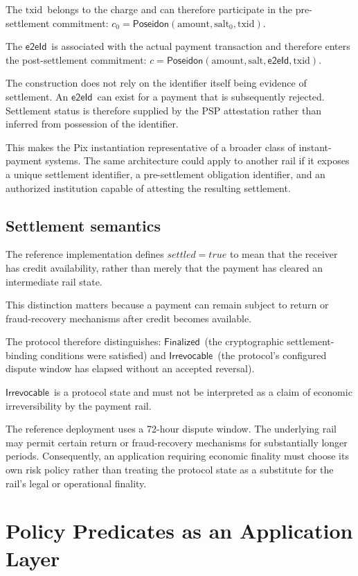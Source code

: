 \documentclass[10pt,twocolumn]{article}
\newcommand{\Poseidon}{\ensuremath{\mathsf{Poseidon}}}
\newcommand{\eeid}{\ensuremath{\mathsf{e2eId}}}
\newcommand{\amount}{\ensuremath{\text{amount}}}
\newcommand{\txid}{\ensuremath{\text{txid}}}
\newcommand{\salt}{\ensuremath{\text{salt}}}
\newcommand{\Finalized}{\ensuremath{\mathsf{Finalized}}}
\newcommand{\Irrevocable}{\ensuremath{\mathsf{Irrevocable}}}
\begin{document}
The \txid\ belongs to the charge and can therefore participate in the
pre-settlement commitment: $c_0=\Poseidon(\amount,\salt_0,\txid)$.

The \eeid\ is associated with the actual payment transaction and
therefore enters the post-settlement commitment:
$c=\Poseidon(\amount,\salt,\eeid,\txid)$.

The construction does not rely on the identifier itself being evidence
of settlement. An \eeid\ can exist for a payment that is subsequently
rejected. Settlement status is therefore supplied by the PSP attestation
rather than inferred from possession of the identifier.

This makes the Pix instantiation representative of a broader class of
instant-payment systems. The same architecture could apply to another
rail if it exposes a unique settlement identifier, a pre-settlement
obligation identifier, and an authorized institution capable of
attesting the resulting settlement.

\subsection{Settlement semantics}

The reference implementation defines $\mathit{settled}=\mathit{true}$ to
mean that the receiver has credit availability, rather than merely that
the payment has cleared an intermediate rail state.

This distinction matters because a payment can remain subject to return
or fraud-recovery mechanisms after credit becomes available.

The protocol therefore distinguishes: \Finalized\ (the cryptographic
settlement-binding conditions were satisfied) and \Irrevocable\ (the
protocol's configured dispute window has elapsed without an accepted
reversal).

\Irrevocable\ is a protocol state and must not be interpreted as a claim
of economic irreversibility by the payment rail.

The reference deployment uses a 72-hour dispute window. The underlying
rail may permit certain return or fraud-recovery mechanisms for
substantially longer periods. Consequently, an application requiring
economic finality must choose its own risk policy rather than treating
the protocol state as a substitute for the rail's legal or operational
finality.

\section{Policy Predicates as an Application Layer}
\label{sec:predicates}
\end{document}
